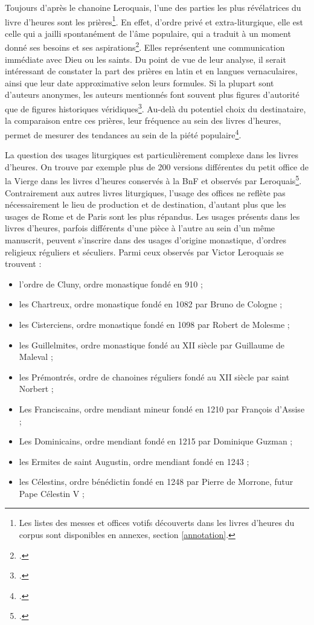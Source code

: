 \documentclass[a4paper,12pt,twoside]{book}
\begin{document}
	Toujours d'après le chanoine Leroquais, l'une des parties les plus révélatrices du livre d'heures sont les prières\footnote{Les listes des messes et offices votifs découverts dans les livres d'heures du corpus sont disponibles en annexes, section \ref{annotation}.}. En effet, d'ordre privé et extra-liturgique, elle est \og celle qui a jailli spontanément de l’âme populaire, qui a traduit à un moment donné ses besoins et ses aspirations\fg{}\footcite[p. XXIX]{Leroquais_notices}. Elles représentent une communication immédiate avec Dieu ou les saints. Du point de vue de leur analyse, il serait intéressant de constater la part des prières en latin et en langues vernaculaires, ainsi que leur date approximative selon leurs formules. Si la plupart sont d'auteurs anonymes, les auteurs mentionnés font souvent plus figures d'autorité que de figures historiques véridiques\footcite[p. XXIX]{Leroquais_notices}. Au-delà du potentiel choix du destinataire, la comparaison entre ces prières, leur fréquence au sein des livres d'heures, permet de mesurer des tendances au sein de la piété populaire\footcite[p. XXX]{Leroquais_notices}. 
	
	La question des usages liturgiques est particulièrement complexe dans les livres d'heures. On trouve par exemple plus de 200 versions différentes du petit office de la Vierge dans les livres d'heures conservés à la BnF et observés par Leroquais\footcite[p. XXXVI]{Leroquais_notices}. Contrairement aux autres livres liturgiques, l'usage des offices ne reflète pas nécessairement le lieu de production et de destination, d'autant plus que les usages de Rome et de Paris sont les plus répandus. Les usages présents dans les livres d'heures, parfois différents d'une pièce à l'autre au sein d'un même manuscrit, peuvent s'inscrire dans des usages d'origine monastique, d'ordres religieux réguliers et séculiers. Parmi ceux observés par Victor Leroquais se trouvent : 
	\begin{itemize}
		\item l'ordre de Cluny, ordre monastique fondé en 910 ;
		\item les Chartreux, ordre monastique fondé en 1082 par Bruno de Cologne ;
	    \item les Cisterciens, ordre monastique fondé en 1098 par Robert de Molesme ;
	    \item les Guillelmites, ordre monastique fondé au \textsc{XII} siècle par Guillaume de Maleval ;
	    \item les Prémontrés, ordre de chanoines réguliers fondé au \textsc{XII} siècle par saint Norbert ;
	    \item Les Franciscains, ordre mendiant mineur fondé en 1210 par François d’Assise ;
	    \item Les Dominicains, ordre mendiant fondé en 1215 par Dominique Guzman ;
	    \item les Ermites de saint Augustin, ordre mendiant fondé en 1243 ;
	    \item les Célestins, ordre bénédictin fondé en 1248 par Pierre de Morrone, futur Pape Célestin V ;
	\end{itemize}
	
\end{document}
